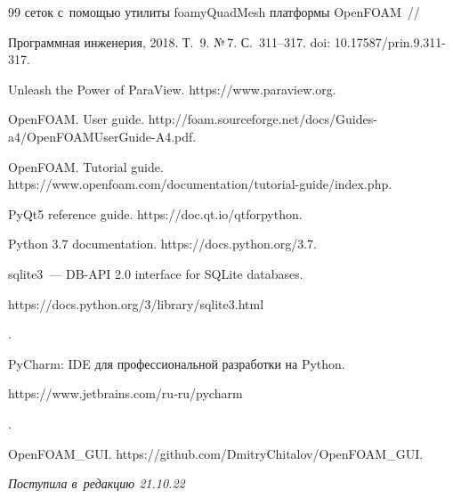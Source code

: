 {{\begin{thebibliography}{99}
сеток с~помощью утилиты \mbox{foamyQuadMesh} платформы \mbox{OpenFOAM}~/\!\!/ 


Программная инженерия, 2018. Т.~9. №\,7. С.~311--317. doi: 10.17587\!/\!prin.9.311-317.




Unleash the Power of ParaView. {\sf https://www.paraview.org}.




OpenFOAM. User guide. {\sf http://foam.sourceforge.net/docs/Guides-a4/Open\linebreak FOAMUserGuide-A4.pdf}.




OpenFOAM. Tutorial guide. {\sf https://www.openfoam.com/documentation/tutorial-guide/index.php}.




PyQt5 reference guide. {\sf https://doc.qt.io/qtforpython}.




Python 3.7 documentation. {\sf https://docs.python.org/3.7}.




sqlite3~--- DB-API 2.0 interface for SQLite databases. {\sf 


https://docs.python.org/3/\linebreak library/sqlite3.html}.




PyCharm: IDE для профессиональной разработки на Python. {\sf  


https://www.\linebreak jetbrains.com/ru-ru/pycharm}.




OpenFOAM\_GUI. {\sf https://github.com/DmitryChitalov/OpenFOAM\_GUI}.


 \end{thebibliography}


} }











\vspace*{-6pt}





\hfill{\small\textit{Поступила в~редакцию 21.10.22}}






